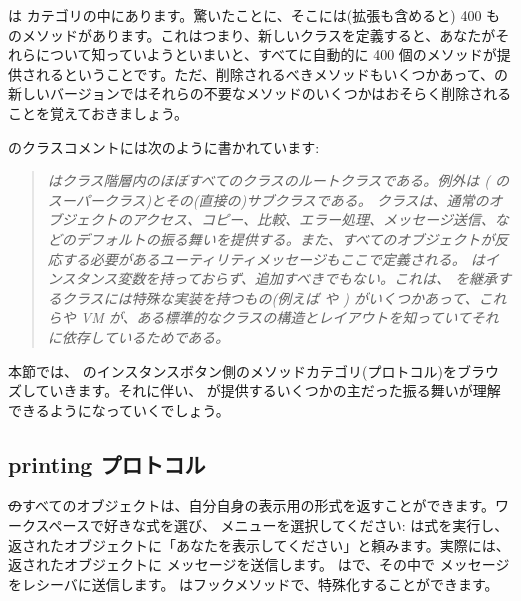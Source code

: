 \documentclass[a4paper,10pt,twoside]{book}
\begin{document}
 は  カテゴリの中にあります。驚いたことに、そこには(拡張も含めると) 400 ものメソッドがあります。これはつまり、新しいクラスを定義すると、あなたがそれらについて知っていようといまいと、すべてに自動的に 400 個のメソッドが提供されるということです。ただ、削除されるべきメソッドもいくつかあって、\pharo の新しいバージョンではそれらの不要なメソッドのいくつかはおそらく削除されることを覚えておきましょう。%

 のクラスコメントには次のように書かれています:

\begin{quote}
\textit{ はクラス階層内のほぼすべてのクラスのルートクラスである。例外は  ( のスーパークラス)とその(直接の)サブクラスである。
 クラスは、通常のオブジェクトのアクセス、コピー、比較、エラー処理、メッセージ送信、などのデフォルトの振る舞いを提供する。また、すべてのオブジェクトが反応する必要があるユーティリティメッセージもここで定義される。
 はインスタンス変数を持っておらず、追加すべきでもない。これは、 を継承するクラスには特殊な実装を持つもの(例えば  や ) がいくつかあって、これらや VM が、ある標準的なクラスの構造とレイアウトを知っていてそれに依存しているためである。}
\end{quote}

本節では、 のインスタンスボタン側のメソッドカテゴリ(プロトコル)をブラウズしていきます。それに伴い、 が提供するいくつかの主だった振る舞いが理解できるようになっていくでしょう。

\subsection{printing プロトコル}
\st のすべてのオブジェクトは、自分自身の表示用の形式を返すことができます。ワークスペースで好きな式を選び、 メニューを選択してください:  は式を実行し、返されたオブジェクトに「あなたを表示してください」と頼みます。実際には、返されたオブジェクトに  メッセージを送信します。 はで、その中で  メッセージをレシーバに送信します。 はフックメソッドで、特殊化することができます。%
\end{document}
